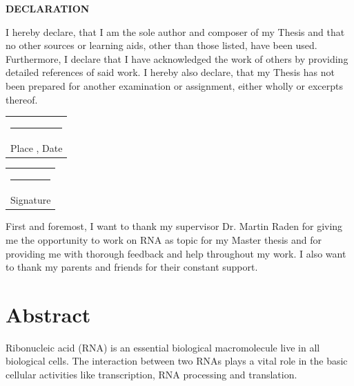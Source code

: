 \documentclass[twoside,a4paper]{report}
\begin{document}


\newpage
\begin{center}

\textbf{ \Large DECLARATION}\\
	
\end{center}
 	\vspace{0.9cm}
I hereby declare, that I am the sole author and composer of my Thesis and that no
other sources or learning aids, other than those listed, have been used. Furthermore, I declare that I have acknowledged the work of others by providing detailed references of said work. I hereby also declare, that my Thesis has not been prepared for another examination or assignment, either wholly or excerpts thereof.
\\

\hfill%
\vspace{0.9cm}

\begin{tabular}[t]{c}
	
	\rule{10em}{0.4pt}\\ Place , Date
\end{tabular}%
\hfill%
\begin{tabular}[t]{c}
	\rule{10em}{0.4pt}\\ Signature
\end{tabular}%


\newpage
First and foremost, I want to thank my supervisor Dr. Martin Raden for giving me the
opportunity to work on RNA as topic for my Master thesis and for providing me
with thorough feedback and help throughout my work.
I also want to thank my parents and friends for their constant support. \\


\newpage
\chapter*{Abstract}

Ribonucleic acid (RNA) is an essential biological macromolecule live in all biological cells. The interaction between two RNAs plays a vital role in the basic cellular activities like transcription, RNA processing and translation.\\
\end{document}
